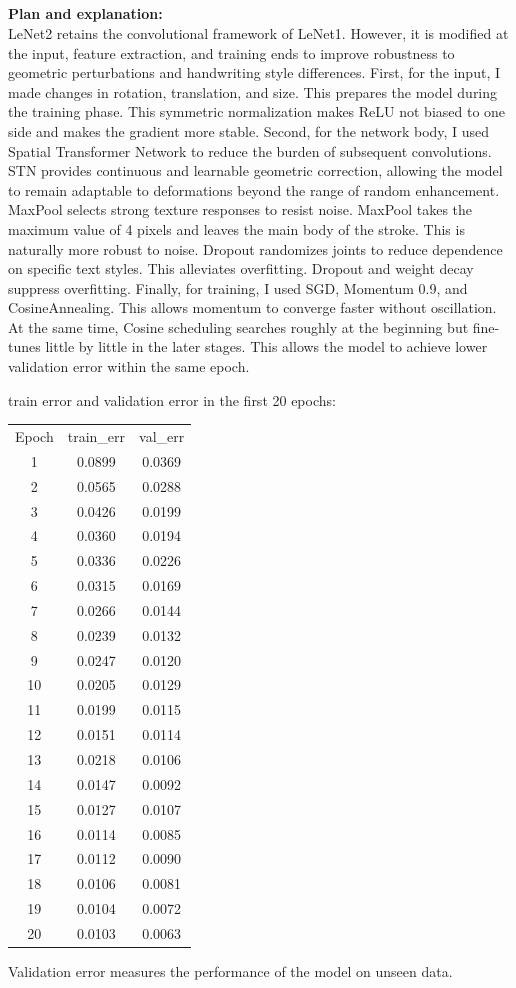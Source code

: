 \documentclass{article}
\begin{document}
\subsection{}
\textbf{Plan and explanation:}
\\
LeNet2 retains the convolutional framework of LeNet1. However, it is modified at the input, feature extraction, and training ends to improve robustness to geometric perturbations and handwriting style differences.
First, for the input, I made changes in rotation, translation, and size. This prepares the model during the training phase. This symmetric normalization makes ReLU not biased to one side and makes the gradient more stable.
Second, for the network body, I used Spatial Transformer Network to reduce the burden of subsequent convolutions. STN provides continuous and learnable geometric correction, allowing the model to remain adaptable to deformations beyond the range of random enhancement. MaxPool selects strong texture responses to resist noise. MaxPool takes the maximum value of 4 pixels and leaves the main body of the stroke. This is naturally more robust to noise. Dropout randomizes joints to reduce dependence on specific text styles. This alleviates overfitting. Dropout and weight decay suppress overfitting.
Finally, for training, I used SGD, Momentum 0.9, and CosineAnnealing. This allows momentum to converge faster without oscillation. At the same time, Cosine scheduling searches roughly at the beginning but fine-tunes little by little in the later stages. This allows the model to achieve lower validation error within the same epoch.

train error and validation error in the first 20 epochs: 
\begin{tabular}{c c c}
Epoch & train\_err & val\_err \\
1  & 0.0899 & 0.0369 \\
2  & 0.0565 & 0.0288 \\
3  & 0.0426 & 0.0199 \\
4  & 0.0360 & 0.0194 \\
5  & 0.0336 & 0.0226 \\
6  & 0.0315 & 0.0169 \\
7  & 0.0266 & 0.0144 \\
8  & 0.0239 & 0.0132 \\
9  & 0.0247 & 0.0120 \\
10 & 0.0205 & 0.0129 \\
11 & 0.0199 & 0.0115 \\
12 & 0.0151 & 0.0114 \\
13 & 0.0218 & 0.0106 \\
14 & 0.0147 & 0.0092 \\
15 & 0.0127 & 0.0107 \\
16 & 0.0114 & 0.0085 \\
17 & 0.0112 & 0.0090 \\
18 & 0.0106 & 0.0081 \\
19 & 0.0104 & 0.0072 \\
20 & 0.0103 & 0.0063 \\
\end{tabular}

Validation error measures the performance of the model on unseen data.
\end{document}
